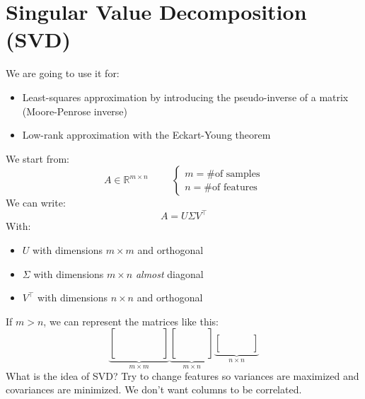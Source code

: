 \section{Singular Value Decomposition (SVD)}
We are going to use it for:
\begin{itemize}
    \item Least-squares approximation by introducing the pseudo-inverse of a matrix (Moore-Penrose inverse)
    \item Low-rank approximation with the Eckart-Young theorem
\end{itemize}
We start from:
\[
A \in \mathbb{R}^{m \times n} \hspace{1cm} 
\begin{cases}
m = \text{\# of samples}\\
n = \text{\# of features}
\end{cases}    
\]
We can write:
\[
    A = U\Sigma V^\intercal    
\]
With:
\begin{itemize}
    \item $U$ with dimensions $m \times m$ and orthogonal
    \item $\Sigma$ with dimensions $m \times n$ \textit{almost} diagonal
    \item $V^\intercal$ with dimensions $n \times n$ and orthogonal
\end{itemize}
If $m > n$, we can represent the matrices like this:
\[
\underbrace{
  \begin{bmatrix}
    & & & & & \\
    & & & & & \\
    & & & & & \\
    & & & & & \\
    & & & & & \\
  \end{bmatrix}}_{m \times m}
\underbrace{
  \begin{bmatrix}
    & & & \\
    & & & \\
    & & & \\
    & & & \\
    & & & \\
  \end{bmatrix}}_{m \times n}
\underbrace{
  \begin{bmatrix}
    & & & \\
    & & & \\
    & & & \\
  \end{bmatrix}}_{n \times n}
\]
What is the idea of SVD? Try to change features so variances are maximized and covariances are minimized. We don't want columns to be correlated.\\

